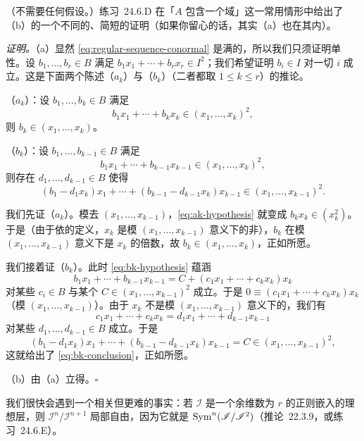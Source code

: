 （不需要任何\trNoetherian{}假设。）\mbox{练习~24.6.D} 在「$A$ 包含一个域」这一常用情形中给出了（b）的一个不同的、简短的证明（如果你留心的话，其实（a）也在其内）。

\emph{证明。}\quad（a）显然 \eqref{eq:regular-sequence-conormal} 是满的，所以我们只须证明单性。设 $b_1,\dots,b_r\in B$ 满足 $b_1x_1+\cdots+b_rx_r\in I^2$；我们希望证明 $b_i\in I$ 对一切 $i$ 成立。这是下面两个陈述（$a_k$）与（$b_k$）（二者都取 $1\le k\le r$）的推论。

（$a_k$）：设 $b_1,\dots,b_k\in B$ 满足
\begin{equation*}\tag{21.2.16.2}\label{eq:ak-hypothesis}
b_1x_1+\cdots+b_kx_k\in(x_1,\dots,x_k)^2,
\end{equation*}
则 $b_k\in(x_1,\dots,x_k)$。

（$b_k$）：设 $b_1,\dots,b_{k-1}\in B$ 满足
\begin{equation*}\tag{21.2.16.3}\label{eq:bk-hypothesis}
b_1x_1+\cdots+b_{k-1}x_{k-1}\in(x_1,\dots,x_k)^2,
\end{equation*}
则存在 $d_1,\dots,d_{k-1}\in B$ 使得
\begin{equation*}\tag{21.2.16.4}\label{eq:bk-conclusion}
(b_1-d_1x_k)x_1+\cdots+(b_{k-1}-d_{k-1}x_k)x_{k-1}\in(x_1,\dots,x_{k-1})^2.
\end{equation*}

我们先证（$a_k$）。模去 $(x_1,\dots,x_{k-1})$，\eqref{eq:ak-hypothesis} 就变成 $b_kx_k\in(x_k^2)$。于是（由于依\trRegularSequence{}的定义，$x_k$ 是模 $(x_1,\dots,x_{k-1})$ 意义下的非\trZerodivisor），$b_k$ 在模 $(x_1,\dots,x_{k-1})$ 意义下是 $x_k$ 的倍数，故 $b_k\in(x_1,\dots,x_k)$，正如所愿。

我们接着证（$b_k$）。此时 \eqref{eq:bk-hypothesis} 蕴涵
\[
b_1x_1+\cdots+b_{k-1}x_{k-1}=C+(c_1x_1+\cdots+c_kx_k)x_k
\]
对某些 $c_i\in B$ 与某个 $C\in(x_1,\dots,x_{k-1})^2$ 成立。于是 $0\equiv(c_1x_1+\cdots+c_kx_k)x_k$（模 $(x_1,\dots,x_{k-1})$）。由于 $x_k$ 不是模 $(x_1,\dots,x_{k-1})$ 意义下的\trZerodivisor，我们有
\[
c_1x_1+\cdots+c_kx_k=d_1x_1+\cdots+d_{k-1}x_{k-1}
\]
对某些 $d_1,\dots,d_{k-1}\in B$ 成立。于是
\[
(b_1-d_1x_k)x_1+\cdots+(b_{k-1}-d_{k-1}x_k)x_{k-1}=C\in(x_1,\dots,x_{k-1})^2,
\]
这就给出了 \eqref{eq:bk-conclusion}，正如所愿。

（b）由（a）立得。\hfill$\square$

我们很快会遇到一个相关但更难的事实：若 $\mathscr{I}$ 是一个余维数为 $r$ 的正则嵌入的理想层，则 $\mathscr{I}^n/\mathscr{I}^{n+1}$ 局部自由，因为它就是 $\operatorname{Sym}^n(\mathscr{I}/\mathscr{I}^2)$（\mbox{推论~22.3.9}，或\mbox{练习~24.6.E}）。


